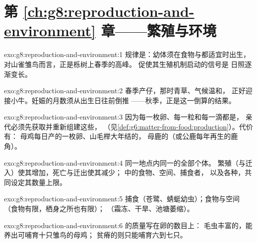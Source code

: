 \section*{第 \ref{ch:g8:reproduction-and-environment} 章——繁殖与环境}

\begin{solution}{exo:g8:reproduction-and-environment:1}
规律是：幼体须在食物与都适宜时出生，
对山雀雏鸟而言，正是栎树上春季的高峰。
促使其生殖机制启动的信号是
日照逐渐变长。
\end{solution}

\begin{solution}{exo:g8:reproduction-and-environment:2}
春季产仔，那时青草、气候温和，
正好迎接小牛。妊娠的月数须从出生日往前倒推
——秋季，正是这一倒算的结果。
\end{solution}

\begin{solution}{exo:g8:reproduction-and-environment:3}
因为每一枚卵、每一粒和每一滴都是，
亲代必须先获取并重新组建这些，
（见\cref{def:g6:matter-from-food:production}）。代价有：
母鸡每日产的一枚卵、山毛榉大年结的，
母鹿的（或公鹿每年再生的鹿角）。
\end{solution}

\begin{solution}{exo:g8:reproduction-and-environment:4}
同一地点内同一的全部个体。
繁殖（与迁入）使其增加，死亡与迁出使其减少；
中的食物、空间、捕食者，
以及各种，共同设定其数量上限。
\end{solution}

\begin{solution}{exo:g8:reproduction-and-environment:5}
捕食（苍鹭、蜻蜓幼虫）；食物与空间
（食物有限，栖身之所也有限）；
（霜冻、干旱、池塘萎缩）。
\end{solution}

\begin{solution}{exo:g8:reproduction-and-environment:6}
的质量写在卵的数目上：
毛虫丰富的，能养出可哺育十只雏鸟的母鸡；
贫瘠的则只能哺育六到七只。
\end{solution}

